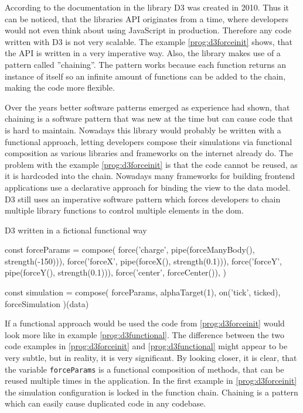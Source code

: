 According to the documentation in \cite{D3Github} the library D3 was created in 2010. Thus it can be noticed, that the libraries API originates from a time, where developers would not even think about using JavaScript in production. Therefore any code written with D3 is not very scalable. The example \ref{prog:d3forceinit} shows, that the API is written in a very imperative way. Also, the library makes use of a pattern called ''chaining''. The pattern works because each function returns an instance of itself so an infinite amount of functions can be added to the chain, making the code more flexible.

Over the years better software patterns emerged as experience had shown, that chaining is a software pattern that was new at the time but can cause code that is hard to maintain. Nowadays this library would probably be written with a functional approach, letting developers compose their simulations via functional composition as various libraries and frameworks on the internet already do. The problem with the example \ref{prog:d3forceinit} is that the code cannot be reused, as it is hardcoded into the chain. Nowadays many frameworks for building frontend applications use a declarative approach for binding the view to the data model. D3 still uses an imperative software pattern which forces developers to chain multiple library functions to control multiple elements in the dom.

\begin{program}
\caption{D3 written in a fictional functional way}
\label{prog:d3functional}
\begin{JsCode}
  
const forceParams = compose(
  force('charge', pipe(forceManyBody(), strength(-150))),
  force('forceX', pipe(forceX(), strength(0.1))),
  force('forceY', pipe(forceY(), strength(0.1))),
  force('center', forceCenter()),
)

const simulation = compose(
  forceParams,
  alphaTarget(1),
  on('tick', ticked),
  forceSimulation
)(data)
\end{JsCode}
\end{program}

If a functional approach would be used the code from \ref{prog:d3forceinit} would look more like in example \ref{prog:d3functional}. The difference between the two code examples in \ref{prog:d3forceinit} and \ref{prog:d3functional} might appear to be very subtle, but in reality, it is very significant. By looking closer, it is clear, that the variable \texttt{forceParams} is a functional composition of methods, that can be reused multiple times in the application. In the first example in \ref{prog:d3forceinit} the simulation configuration is locked in the function chain. Chaining is a pattern which can easily cause duplicated code in any codebase. 

